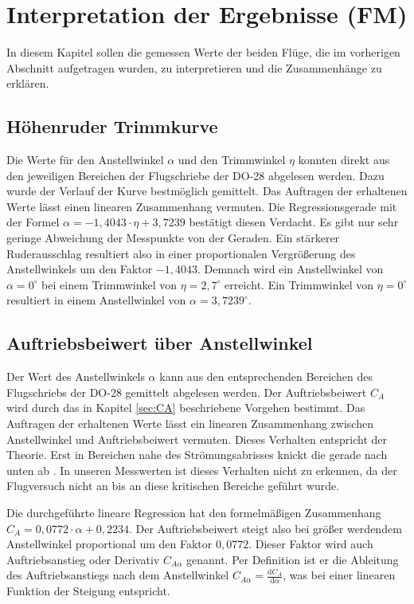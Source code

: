 \chapter{Interpretation der Ergebnisse (FM)}

In diesem Kapitel sollen die gemessen Werte der beiden Flüge, die im vorherigen Abschnitt aufgetragen wurden, zu interpretieren und die Zusammenhänge zu erklären. 

\section{Höhenruder Trimmkurve}
Die Werte für den Anstellwinkel $\alpha$ und den Trimmwinkel $\eta$ konnten direkt aus den jeweiligen Bereichen der Flugschriebe der DO-28 abgelesen werden. Dazu wurde der Verlauf der Kurve bestmöglich gemittelt. Das Auftragen der erhaltenen Werte lässt einen linearen Zusammenhang vermuten. Die Regressionsgerade mit der Formel $\alpha = -1,4043 \cdot \eta + 3,7239$ bestätigt diesen Verdacht. Es gibt nur sehr geringe Abweichung der Messpunkte von der Geraden. Ein stärkerer Ruderausschlag resultiert also in einer proportionalen Vergrößerung des Anstellwinkels um den Faktor $- 1,4043$.
Demnach wird ein Anstellwinkel von $\alpha = 0^{\circ}$ bei einem Trimmwinkel von $\eta = 2,7^{\circ}$ erreicht. Ein Trimmwinkel von $\eta = 0^{\circ}$ resultiert in einem Anstellwinkel von $\alpha = 3,7239^{\circ}$.

\section{Auftriebsbeiwert über Anstellwinkel}
Der Wert des Anstellwinkels $\alpha$ kann aus den entsprechenden Bereichen des Flugschriebs der DO-28 gemittelt abgelesen werden. Der Auftriebsbeiwert $C_A$ wird durch das in Kapitel \ref{sec:CA} beschriebene Vorgehen bestimmt. 
Das Auftragen der erhaltenen Werte lässt ein linearen Zusammenhang zwischen Anstellwinkel und Auftriebsbeiwert vermuten. Dieses Verhalten entspricht der Theorie. Erst in Bereichen nahe des Strömungsabrisses knickt die gerade nach unten ab \citep{Skript}. In unseren Messwerten ist dieses Verhalten nicht zu erkennen, da der Flugversuch nicht an bis an diese kritischen Bereiche geführt wurde.

Die durchgeführte lineare Regression hat den formelmäßigen Zusammenhang $C_A = 0,0772 \cdot \alpha + 0,2234$. Der Auftriebsbeiwert steigt also bei größer werdendem Anstellwinkel proportional um den Faktor $0,0772$. Dieser Faktor wird auch Auftriebsanstieg oder Derivativ $C_{A \alpha}$ genannt. Per Definition ist er die Ableitung des Auftriebsanstiegs nach dem Anstellwinkel $C_{A \alpha} = \frac{\mathrm{d} C_A}{\mathrm{d} \alpha}$, was bei einer linearen Funktion der Steigung entspricht. 

